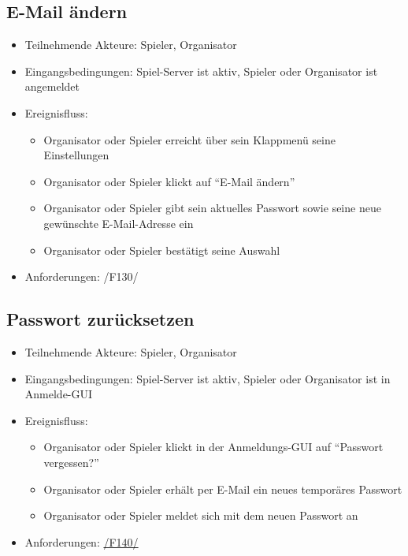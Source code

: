 \documentclass[a4paper]{scrreprt}
\begin{document}
	\subsection{E-Mail ändern}
	\begin{itemize}
		\item Teilnehmende Akteure: \Gls{Spieler}, \Gls{Organisator}
		\item Eingangsbedingungen: \Gls{Spiel-Server} ist aktiv, \Gls{Spieler} oder \Gls{Organisator} ist angemeldet
		\item Ereignisfluss:
		\begin{itemize}
			\item \Gls{Organisator} oder \Gls{Spieler} erreicht über sein Klappmenü seine Einstellungen
			\item \Gls{Organisator} oder \Gls{Spieler} klickt auf \enquote{E-Mail ändern}
			\item \Gls{Organisator} oder \Gls{Spieler} gibt sein aktuelles Passwort sowie seine neue gewünschte E-Mail-Adresse ein
			\item \Gls{Organisator} oder \Gls{Spieler} bestätigt seine Auswahl
		\end{itemize}
		\item Anforderungen: /F130/
	\end{itemize}

    \subsection{Passwort zurücksetzen}
    \begin{itemize}
        \item Teilnehmende Akteure: \Gls{Spieler}, \Gls{Organisator}
        \item Eingangsbedingungen: \Gls{Spiel-Server} ist aktiv, \Gls{Spieler} oder \Gls{Organisator} ist in Anmelde-GUI
        \item Ereignisfluss:
        \begin{itemize}
            \item \Gls{Organisator} oder \Gls{Spieler} klickt in der Anmeldungs-GUI auf \enquote{Passwort vergessen?}
            \item \Gls{Organisator} oder \Gls{Spieler} erhält per E-Mail ein neues temporäres Passwort
            \item \Gls{Organisator} oder \Gls{Spieler} meldet sich mit dem neuen Passwort an
        \end{itemize}
        \item Anforderungen: \hyperlink{F140}{/F140/}
    \end{itemize}
\end{document}
